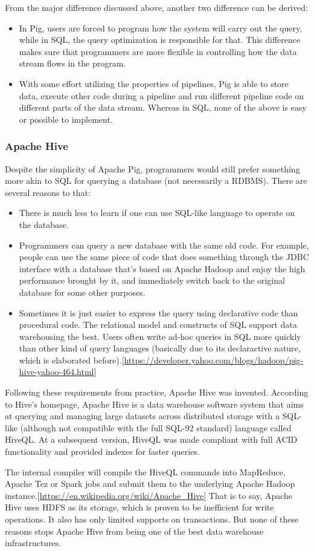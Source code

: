 \documentclass{article}
\begin{document}
From the major difference discussed above, another two difference can be derived:
\begin{itemize}
\item In Pig, users are forced to program how the system will carry
  out the query, while in SQL, the query optimization is responsible
  for that. This difference makes sure that programmers are more
  flexible in controlling how the data stream flows in the program.
\item With some effort utilizing the properties of pipelines, Pig is
  able to store data, execute other code during a pipeline and run
  different pipeline code on different parts of the data
  stream. Whereas in SQL, none of the above is easy or possible to
  implement.
\end{itemize}

\subsubsection{Apache Hive}

Despite the simplicity of Apache Pig, programmers would still prefer something more akin to SQL for querying a database (not necessarily a RDBMS). There are several reasons to that:

\begin{itemize}
\item There is much less to learn if one can use SQL-like language to operate on the database.
\item Programmers can query a new database with the same old code. For example, people can use the same piece of code that does something through the JDBC interface with a database that's based on Apache Hadoop and enjoy the high performance brought by it, and immediately switch back to the original database for some other purposes.
\item Sometimes it is just easier to express the query using declarative code than procedural code. The relational model and constructs of SQL support data warehousing the best. Users often write ad-hoc queries in SQL more quickly than other kind of query languages (basically due to its declaractive nature, which is elaborated before).[\url{https://developer.yahoo.com/blogs/hadoop/pig-hive-yahoo-464.html}]
\end{itemize}

Following these requirements from practice, Apache Hive was invented. According to Hive's homepage, Apache Hive is a data warehouse software system that aims at querying and managing large datasets across distributed storage with a SQL-like (although not compatible with the full SQL-92 standard) language called HiveQL. At a subsequent version, HiveQL was made compliant with full ACID functionality and provided indexes for faster queries.

The internal compiler will compile the HiveQL commands into MapReduce, Apache Tez or Spark jobs and submit them to the underlying Apache Hadoop instance.[\url{https://en.wikipedia.org/wiki/Apache_Hive}] That is to say, Apache Hive uses HDFS as its storage, which is proven to be inefficient for write operations. It also has only limited supports on transactions. But none of these reasons stops Apache Hive from being one of the best data warehouse infrastructures.
\end{document}
